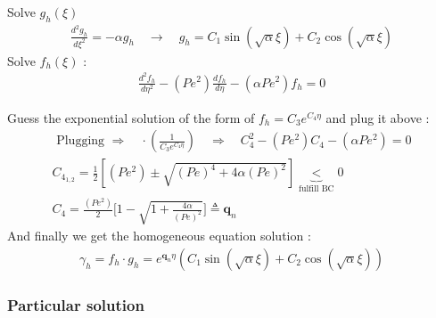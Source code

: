 \documentclass[12pt]{article}
\numberwithin{equation}{section}
\begin{document}
\begin{flushleft}
Solve $g_{h}(\xi)$
\begin{align} 
\frac{d^{2} g_{h}}{d \xi^{2}}=-\alpha g_{h} \quad \rightarrow \quad g_{h}=C_{1} \sin (\sqrt{\alpha} \xi)+C_{2} \cos (\sqrt{\alpha} \xi)
\end{align} 
Solve $f_{h}(\xi)$ :
\begin{align} 
\frac{d^{2} f_{h}}{d \eta^{2}}-(P e^{2}) \frac{d f_{h}}{d \eta}-(\alpha P e^{2}) f_{h}=0
\end{align} 

Guess the exponential solution of the form of $f_{h}=C_{3} e^{C_{4} \eta}$ and plug it above :
\begin{align} 
\text { Plugging } \Rightarrow \quad \cdot  (\frac{1}{C_{3} e^{C_{4} \eta}} ) \quad \Rightarrow \quad C_{4}^{2}- (Pe^{2} ) C_{4}- (\alpha Pe^{2} )=0 \\
C_{4_{1,2}}= \frac{1}{2} [ (Pe^{2} ) \pm \sqrt{(Pe)^{4}+4 \alpha(Pe)^{2}}] \underbrace{<}_{\text {fulfill BC}} 0 \\
C_{4}=\frac{ (Pe^{2} )}{2} \bigg[1-\sqrt{1+\frac{4 \alpha}{(Pe)^{2}}} \bigg]  \triangleq \mathbf{q}_{n}
\end{align} 
And finally we get the homogeneous equation solution :
\begin{align} 
\gamma_{h}=f_{h} \cdot g_{h}=e^{\mathbf{q}_{n} \eta} (C_{1} \sin (\sqrt{\alpha} \xi)+C_{2} \cos (\sqrt{\alpha} \xi) )
\end{align} 

\subsubsection*{Particular solution}


\end{flushleft}
\end{document}
